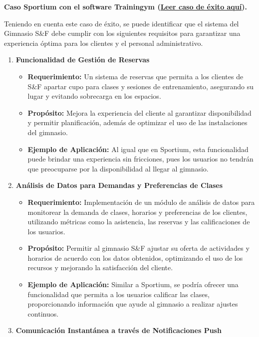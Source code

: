 \textbf{Caso Sportium con el software Trainingym (\href{https://trainingym.com/es/stories-sportium}{Leer caso de éxito aquí}).}

Teniendo en cuenta este caso de éxito, se puede identificar que el sistema del Gimnasio S\&F debe cumplir con los siguientes requisitos para garantizar una experiencia óptima para los clientes y el personal administrativo.

\begin{enumerate}
    \item \textbf{Funcionalidad de Gestión de Reservas}
    \begin{itemize}
        \item \textbf{Requerimiento:} Un sistema de reservas que permita a los clientes de S\&F apartar cupo para clases y sesiones de entrenamiento, asegurando su lugar y evitando sobrecarga en los espacios.
        \item \textbf{Propósito:} Mejora la experiencia del cliente al garantizar disponibilidad y permitir planificación, además de optimizar el uso de las instalaciones del gimnasio.
        \item \textbf{Ejemplo de Aplicación:} Al igual que en Sportium, esta funcionalidad puede brindar una experiencia sin fricciones, pues los usuarios no tendrán que preocuparse por la disponibilidad al llegar al gimnasio.
    \end{itemize}
    \item \textbf{Análisis de Datos para Demandas y Preferencias de Clases}
    \begin{itemize}
        \item \textbf{Requerimiento:} Implementación de un módulo de análisis de datos para monitorear la demanda de clases, horarios y preferencias de los clientes, utilizando métricas como la asistencia, las reservas y las calificaciones de los usuarios.
        \item \textbf{Propósito:} Permitir al gimnasio S\&F ajustar su oferta de actividades y horarios de acuerdo con los datos obtenidos, optimizando el uso de los recursos y mejorando la satisfacción del cliente.
        \item \textbf{Ejemplo de Aplicación:} Similar a Sportium, se podría ofrecer una funcionalidad que permita a los usuarios calificar las clases, proporcionando información que ayude al gimnasio a realizar ajustes continuos.
    \end{itemize}
    \item \textbf{Comunicación Instantánea a través de Notificaciones Push}

\end{enumerate}
